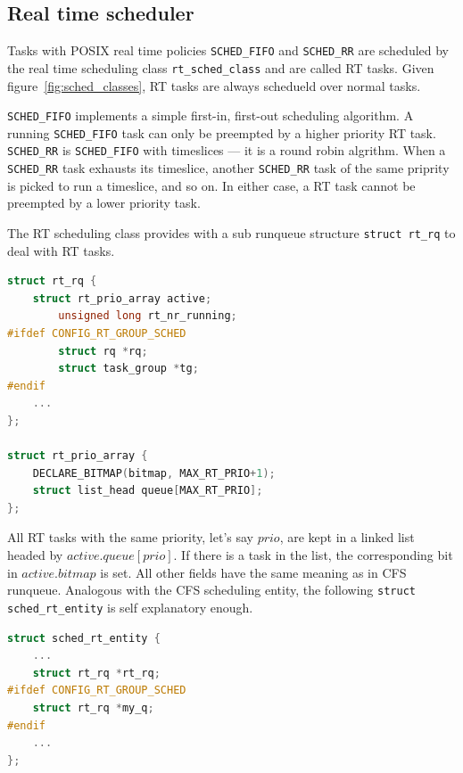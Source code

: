 \subsection{Real time scheduler\label{sec:LinuxSched_rt}}

Tasks with POSIX real time policies \texttt{SCHED\_FIFO} and \texttt{SCHED\_RR}
are scheduled by the real time scheduling class \texttt{rt\_sched\_class} and
are called RT tasks. Given figure~\vref{fig:sched_classes}, RT tasks are always
schedueld over normal tasks. 

\texttt{SCHED\_FIFO} implements a simple first-in, first-out scheduling 
algorithm. A running \texttt{SCHED\_FIFO} task can only be preempted by a 
higher priority RT task. \texttt{SCHED\_RR} is \texttt{SCHED\_FIFO} with 
timeslices --- it is a round robin algrithm. When a \texttt{SCHED\_RR}
task exhausts its timeslice, another \texttt{SCHED\_RR} task of the same
priprity is picked to run a timeslice, and so on. In either case, a RT task
cannot be preempted by a lower priority task.

The RT scheduling class provides with a sub runqueue structure 
\texttt{struct rt\_rq} to deal with RT tasks.
\begin{lstlisting}[language=C,
		caption={\texttt{The RT runqueue}},
		label={lst:rtrunqueue}]
struct rt_rq {
	struct rt_prio_array active;
        unsigned long rt_nr_running;
#ifdef CONFIG_RT_GROUP_SCHED
        struct rq *rq;
        struct task_group *tg;
#endif
	...
};

struct rt_prio_array {
	DECLARE_BITMAP(bitmap, MAX_RT_PRIO+1); 
	struct list_head queue[MAX_RT_PRIO];
};
\end{lstlisting}
All RT tasks with the same priority, let's say $prio$, are kept in a linked 
list headed by $active.queue[prio]$. If there is a task in the list, the 
corresponding bit in $active.bitmap$ is set. All other fields have the same
meaning as in CFS runqueue. Analogous with the CFS scheduling entity, the 
following \texttt{struct sched\_rt\_entity} is self explanatory enough. 
\begin{lstlisting}[language=C,
		caption={\texttt{The RT scheduling entity}},
		label={rt_entity}]
struct sched_rt_entity {
	...
	struct rt_rq *rt_rq;
#ifdef CONFIG_RT_GROUP_SCHED
	struct rt_rq *my_q;
#endif
	...
}; 
\end{lstlisting}

